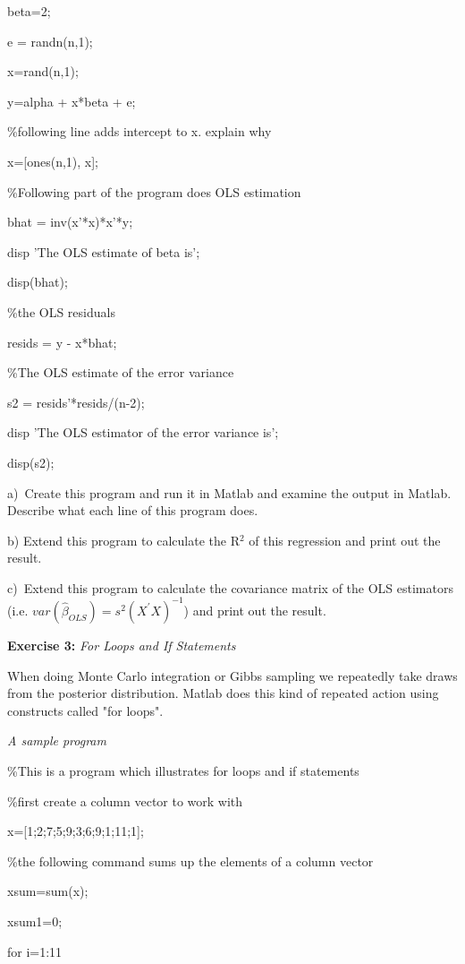 \documentclass{article}
\begin{document}
beta=2;

e = randn(n,1);

x=rand(n,1);

y=alpha + x*beta + e;

\%following line adds intercept to x. explain why

x=[ones(n,1), x];

\%Following part of the program does OLS estimation

bhat = inv(x'*x)*x'*y;

disp 'The OLS estimate of beta is';

disp(bhat);

\%the OLS residuals

resids = y - x*bhat;

\%The OLS estimate of the error variance

s2 = resids'*resids/(n-2);

disp 'The OLS estimator of the error variance is';

disp(s2);

\bigskip

a)\ Create this program and run it in Matlab and examine the output in
Matlab. Describe what each line of this program does.

b) Extend this program to calculate the R$^{2}$ of this regression and print
out the result.

c)\ Extend this program to calculate the covariance matrix of the OLS
estimators (i.e. $var\left( \widehat{\beta }_{OLS}\right) =s^{2}\left(
X^{\prime }X\right) ^{-1}$) and print out the result.

\bigskip

\textbf{Exercise 3: }\textit{For Loops and If Statements}

\qquad When doing Monte Carlo integration or Gibbs sampling we repeatedly
take draws from the posterior distribution. Matlab does this kind of
repeated action using constructs called "for loops".

\textit{A sample program}

\%This is a program which illustrates for loops and if statements

\%first create a column vector to work with

x=[1;2;7;5;9;3;6;9;1;11;1];

\%the following command sums up the elements of a column vector

xsum=sum(x);

xsum1=0;

for i=1:11
\end{document}
